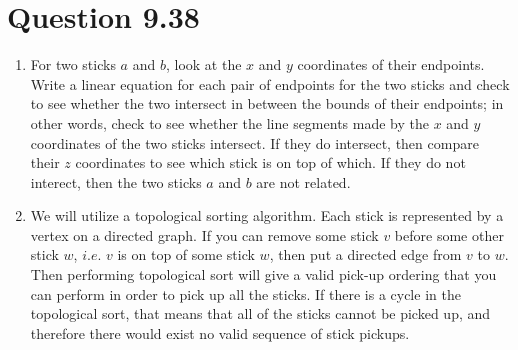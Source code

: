 \documentclass[12pt]{article}
\begin{document}
\newpage

\section{Question 9.38}
\renewcommand{\theenumi}{\alph{enumi}}
\begin{enumerate}
\item For two sticks $a$ and $b$, look at the $x$ and $y$ coordinates of their endpoints. Write a linear equation for each pair of endpoints for the two sticks and check to see whether the two intersect in between the bounds of their endpoints; in other words, check to see whether the line segments made by the $x$ and $y$ coordinates of the two sticks intersect. If they do intersect, then compare their $z$ coordinates to see which stick is on top of which. If they do not interect, then the two sticks $a$ and $b$ are not related.
\item We will utilize a topological sorting algorithm. Each stick is represented by a vertex on a directed graph. If you can remove some stick $v$ before some other stick $w$, $i.e.$ $v$ is on top of some stick $w$, then put a directed edge from $v$ to $w$. Then performing topological sort will give a valid pick-up ordering that you can perform in order to pick up all the sticks. If there is a cycle in the topological sort, that means that all of the sticks cannot be picked up, and therefore there would exist no valid sequence of stick pickups.
\end{enumerate}
\end{document}
